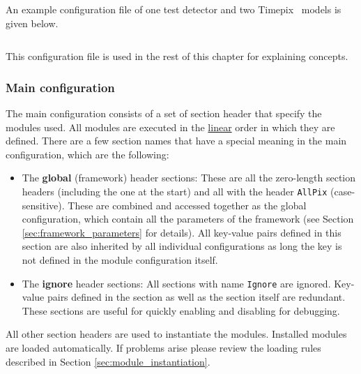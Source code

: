 An example configuration file of one test detector and two Timepix~\cite{timepix} models is given below. 
\inputminted[frame=single,framesep=3pt,breaklines=true,tabsize=2,linenos]{ini}{../../etc/manual_detector.conf}

This configuration file is used in the rest of this chapter for explaining concepts. 

\subsubsection{Main configuration}
\label{sec:main_config}
The main configuration consists of a set of section header that specify the modules used. All modules are executed in the \underline{linear} order in which they are defined. There are a few section names that have a special meaning in the main configuration, which are the following:
\begin{itemize}
\item The \textbf{global} (framework) header sections: These are all the zero-length section headers (including the one at the start) and all with the header \texttt{AllPix} (case-sensitive). These are combined and accessed together as the global configuration, which contain all the parameters of the framework (see Section \ref{sec:framework_parameters} for details). All key-value pairs defined in this section are also inherited by all individual configurations as long the key is not defined in the module configuration itself.
\item The \textbf{ignore} header sections: All sections with name \texttt{Ignore} are ignored. Key-value pairs defined in the section as well as the section itself are redundant. These sections are useful for quickly enabling and disabling for debugging.
\end{itemize}
All other section headers are used to instantiate the modules. Installed modules are loaded automatically. If problems arise please review the loading rules described in Section \ref{sec:module_instantiation}.


